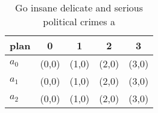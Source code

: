 \documentclass[a4paper]{article}
\begin{document}
\begin{table}
\begin{adjustbox}{width=0.5\columnwidth}
\begin{tabular}{|l|l|l|l|l|}
\hline
\textbf{plan} & \multicolumn{1}{c|}{\textbf{0}} & \multicolumn{1}{c|}{\textbf{1}} & \multicolumn{1}{c|}{\textbf{2}} & \multicolumn{1}{c|}{\textbf{3}} \\ \hline
\textbf{$a_0$}  & (0,0) & (1,0) & (2,0) & (3,0) \\ \hline
\textbf{$a_1$}  & (0,0) & (1,0) & (2,0) & (3,0) \\ \hline
\textbf{$a_2$}  & (0,0) & (1,0) & (2,0) & (3,0) \\ \hline
\end{tabular}
\end{adjustbox}
\caption{Go insane delicate and serious political crimes a
}
\end{table}
\end{document}
